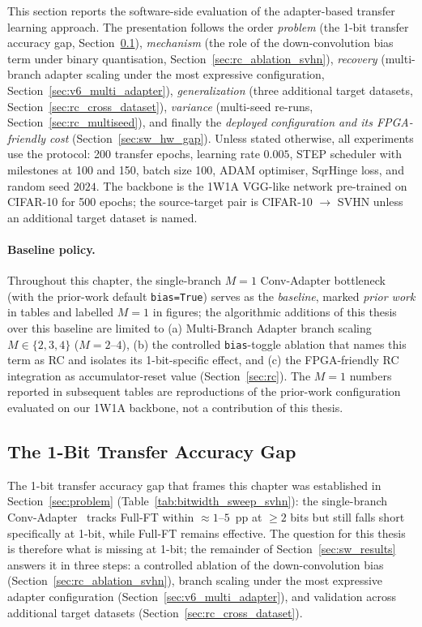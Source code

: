 \documentclass[12pt, a4paper]{report}
\numberwithin{equation}{chapter}
\numberwithin{figure}{chapter}
\numberwithin{table}{chapter}
\numberwithin{algorithm}{chapter}
\begin{document}
This section reports the software-side evaluation of the adapter-based transfer learning approach. The presentation follows the order \emph{problem} (the 1-bit transfer accuracy gap, Section~\ref{sec:problem_1bit_gap}), \emph{mechanism} (the role of the down-convolution bias term under binary quantisation, Section~\ref{sec:rc_ablation_svhn}), \emph{recovery} (multi-branch adapter scaling under the most expressive configuration, Section~\ref{sec:v6_multi_adapter}), \emph{generalization} (three additional target datasets, Section~\ref{sec:rc_cross_dataset}), \emph{variance} (multi-seed re-runs, Section~\ref{sec:rc_multiseed}), and finally the \emph{deployed configuration and its FPGA-friendly cost} (Section~\ref{sec:sw_hw_gap}). Unless stated otherwise, all experiments use the protocol: 200 transfer epochs, learning rate $0.005$, STEP scheduler with milestones at 100 and 150, batch size 100, ADAM optimiser, SqrHinge loss, and random seed $2024$. The backbone is the 1W1A VGG-like network pre-trained on CIFAR-10 for 500 epochs; the source-target pair is CIFAR-10 $\to$ SVHN unless an additional target dataset is named.

\paragraph{Baseline policy.} Throughout this chapter, the single-branch $M{=}1$ Conv-Adapter bottleneck~\cite{Chen2024ConvAdapter} (with the prior-work default \texttt{bias=True}) serves as the \emph{baseline}, marked \emph{prior work} in tables and labelled \emph{$M{=}1$} in figures; the algorithmic additions of this thesis over this baseline are limited to (a) Multi-Branch Adapter branch scaling $M \in \{2, 3, 4\}$ ($M{=}2$--$4$), (b) the controlled \texttt{bias}-toggle ablation that names this term as RC and isolates its 1-bit-specific effect, and (c) the FPGA-friendly RC integration as accumulator-reset value (Section~\ref{sec:rc}). The $M{=}1$ numbers reported in subsequent tables are reproductions of the prior-work configuration evaluated on our 1W1A backbone, not a contribution of this thesis.

\subsection{The 1-Bit Transfer Accuracy Gap}
\label{sec:problem_1bit_gap}

The 1-bit transfer accuracy gap that frames this chapter was established in Section~\ref{sec:problem} (Table~\ref{tab:bitwidth_sweep_svhn}): the single-branch Conv-Adapter~\cite{Chen2024ConvAdapter} tracks Full-FT within $\approx 1$--$5$~pp at $\geq 2$ bits but still falls short specifically at 1-bit, while Full-FT remains effective. The question for this thesis is therefore what is missing at 1-bit; the remainder of Section~\ref{sec:sw_results} answers it in three steps: a controlled ablation of the down-convolution bias (Section~\ref{sec:rc_ablation_svhn}), branch scaling under the most expressive adapter configuration (Section~\ref{sec:v6_multi_adapter}), and validation across additional target datasets (Section~\ref{sec:rc_cross_dataset}).
\end{document}
